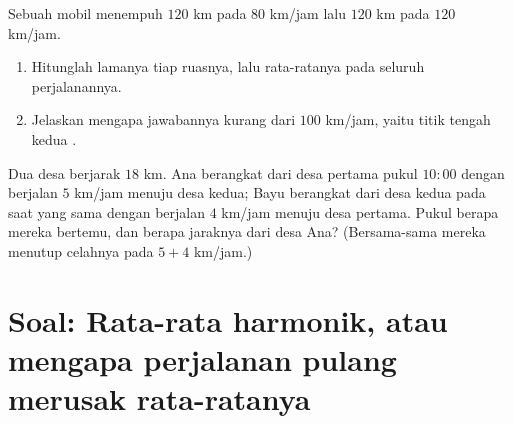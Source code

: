 \begin{exercise}[$\star\star$]\label{exo:g8:speed:10}
Sebuah mobil menempuh $120$ km pada $80$ km/jam lalu $120$ km pada
$120$ km/jam.
\begin{enumerate}
  \item Hitunglah lamanya tiap ruasnya, lalu  rata-ratanya
        pada seluruh perjalanannya.
  \item Jelaskan mengapa jawabannya kurang dari $100$ km/jam, yaitu
        titik tengah kedua .
\end{enumerate}
\end{exercise}

\begin{exercise}[$\star\star\star$]\label{exo:g8:speed:11}
Dua desa berjarak $18$ km. Ana berangkat dari desa pertama pukul
$10{:}00$ dengan berjalan $5$ km/jam menuju desa kedua; Bayu berangkat
dari desa kedua pada saat yang sama dengan berjalan $4$ km/jam menuju
desa pertama. Pukul berapa mereka bertemu, dan berapa jaraknya dari
desa Ana? (Bersama-sama mereka menutup celahnya pada $5 + 4$ km/jam.)
\end{exercise}

\section{Soal: Rata-rata harmonik, atau mengapa perjalanan pulang
merusak rata-ratanya}

